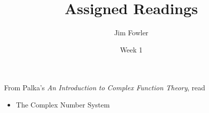\documentclass{homework}
\author{Jim Fowler}
\title{Assigned Readings}
\date{Week 1}
\begin{document}
\maketitle

From Palka's \textit{An Introduction to Complex Function Theory}, read
\begin{itemize}
\item {} The Complex Number System
\end{itemize}
\end{document}
